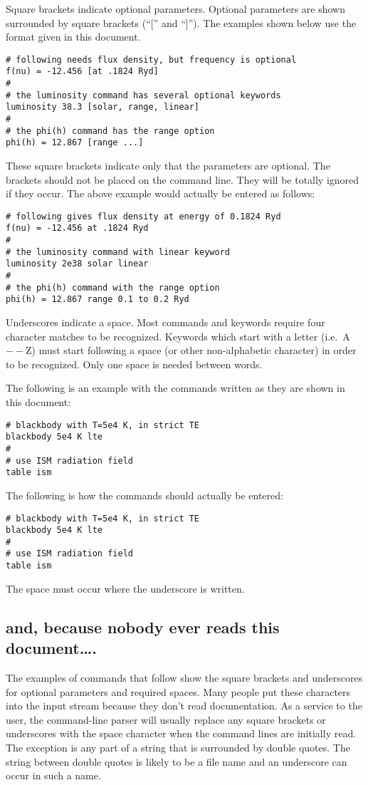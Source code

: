 Square brackets indicate optional parameters.
Optional parameters are
shown surrounded by square brackets (``['' and ``]'').
The examples shown
below use the format given in this document.
\begin{verbatim}
# following needs flux density, but frequency is optional
f(nu) = -12.456 [at .1824 Ryd]
#
# the luminosity command has several optional keywords
luminosity 38.3 [solar, range, linear]
#
# the phi(h) command has the range option
phi(h) = 12.867 [range ...]
\end{verbatim}
These square brackets indicate only that the parameters are optional.
The brackets should not be placed on the command line.
They will be totally ignored if they occur.
The above example would actually be entered as follows:
\begin{verbatim}
# following gives flux density at energy of 0.1824 Ryd
f(nu) = -12.456 at .1824 Ryd
#
# the luminosity command with linear keyword
luminosity 2e38 solar linear
#
# the phi(h) command with the range option
phi(h) = 12.867 range 0.1 to 0.2 Ryd
\end{verbatim}

Underscores indicate a space.  Most commands and keywords require four
character matches to be recognized.  Keywords which start with a letter (i.e.\ A$--$Z) must start following a space (or other non-alphabetic character) in order to be recognized.
Only one space is needed between words.

The following is an example with the commands written as they are shown
in this document:
\begin{verbatim}
# blackbody with T=5e4 K, in strict TE
blackbody 5e4 K lte
#
# use ISM radiation field
table ism
\end{verbatim}
The following is how the commands should actually be entered:
\begin{verbatim}
# blackbody with T=5e4 K, in strict TE
blackbody 5e4 K lte
#
# use ISM radiation field
table ism
\end{verbatim}
The space must occur where the underscore is written.

\subsection{and, because nobody ever reads this document\dots.}

The examples of commands that follow show the square brackets
and underscores for
optional parameters and required spaces.
Many people put these characters
into the input stream because they don't read documentation.
As a service to the user, the command-line parser will
usually replace any square brackets
or underscores with the space character when the command lines
are initially read.
The exception is any part of a string that is surrounded by double
quotes.
The string between double quotes is likely to be a file name and
an underscore can occur in such a name.


